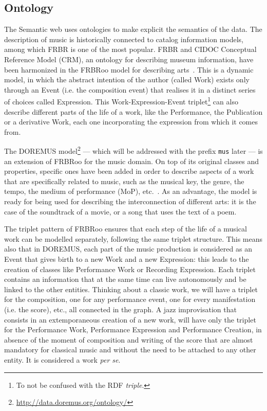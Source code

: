 \subsection{Ontology}\label{subsec:onto}
The Semantic web uses ontologies to make explicit the semantics of the data. The description of music is historically connected to catalog information models, among which FRBR is one of the most popular. FRBR and CIDOC Conceptual Reference Model (CRM), an ontology for describing museum information, have been harmonized in the FRBRoo model for describing arts~\cite{doerr2008frbroo}. This is a dynamic model, in which the abstract intention of the author (called Work) exists only through an Event (i.e. the composition event) that realises it in a distinct series of choices called Expression. This Work-Expression-Event triplet\footnote{To not be confused with the RDF \textit{triple}.} can also describe different parts of the life of a work, like the Performance, the Publication or a derivative Work, each one incorporating the expression from which it comes from.

The DOREMUS model\footnote{\url{http://data.doremus.org/ontology/}} --- which will be addressed with the prefix \texttt{mus} later --- is an extension of FRBRoo for the music domain. On top of its original classes and properties, specific ones have been added in order to describe aspects of a work that are specifically related to music, such as the musical key, the genre, the tempo, the medium of performance (MoP), etc.~\cite{choffe2016doremus}. As an advantage, the model is ready for being used for describing the interconnection of different arts: it is the case of the soundtrack of a movie, or a song that uses the text of a poem.

The triplet pattern of FRBRoo ensures that each step of the life of a musical work can be modelled separately, following the same triplet structure. This means also that in DOREMUS, each part of the music production is considered as an Event that gives birth to a new Work and a new Expression: this leads to the creation of classes like Performance Work or Recording Expression. Each triplet contains an information that at the same time can live autonomously and be linked to the other entities. Thinking about a classic work, we will have a triplet for the composition, one for any performance event, one for every manifestation (i.e. the score), etc., all connected in the graph. A jazz improvisation that consists in an extemporaneous creation of a new work, will have only the triplet for the Performance Work, Performance Expression and Performance Creation, in absence of the moment of composition and writing of the score that are almost mandatory for classical music and without the need to be attached to any other entity. It is considered a work \textit{per se}.

